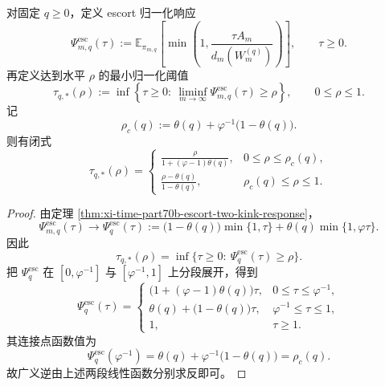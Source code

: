 \begin{theorem}\label{thm:xi-time-part70ab-escort-response-inverse-threshold-closed}
对固定 \(q\ge 0\)，定义 escort 归一化响应
\[
\Psi_{m,q}^{\mathrm{esc}}(\tau):=
\mathbb E_{\pi_{m,q}}
\left[
\min\!\left(1,\frac{\tau A_m}{d_m(W_m^{(q)})}\right)
\right],
\qquad
\tau\ge 0.
\]
再定义达到水平 \(\rho\) 的最小归一化阈值
\[
\tau_{q,\ast}(\rho):=
\inf\left\{\tau\ge 0:\ \liminf_{m\to\infty}\Psi_{m,q}^{\mathrm{esc}}(\tau)\ge \rho\right\},
\qquad
0\le \rho\le 1.
\]
记
\[
\rho_c(q):=\theta(q)+\varphi^{-1}\bigl(1-\theta(q)\bigr).
\]
则有闭式
\[
\tau_{q,\ast}(\rho)=
\begin{cases}
\displaystyle \frac{\rho}{1+(\varphi-1)\theta(q)},
& 0\le \rho\le \rho_c(q),\\[3mm]
\displaystyle \frac{\rho-\theta(q)}{1-\theta(q)},
& \rho_c(q)\le \rho\le 1.
\end{cases}
\]
\end{theorem}
\begin{proof}
由定理 \ref{thm:xi-time-part70b-escort-two-kink-response}，
\[
\Psi_{m,q}^{\mathrm{esc}}(\tau)\longrightarrow
\Psi_q^{\mathrm{esc}}(\tau):=
\bigl(1-\theta(q)\bigr)\min\{1,\tau\}
+
\theta(q)\min\{1,\varphi\tau\}.
\]
因此
\[
\tau_{q,\ast}(\rho)=\inf\{\tau\ge 0:\ \Psi_q^{\mathrm{esc}}(\tau)\ge \rho\}.
\]
把 \(\Psi_q^{\mathrm{esc}}\) 在 \([0,\varphi^{-1}]\) 与 \([\varphi^{-1},1]\) 上分段展开，得到
\[
\Psi_q^{\mathrm{esc}}(\tau)=
\begin{cases}
\bigl(1+(\varphi-1)\theta(q)\bigr)\tau,
& 0\le \tau\le \varphi^{-1},\\[6pt]
\theta(q)+\bigl(1-\theta(q)\bigr)\tau,
& \varphi^{-1}\le \tau\le 1,\\[6pt]
1, & \tau\ge 1.
\end{cases}
\]
其连接点函数值为
\[
\Psi_q^{\mathrm{esc}}(\varphi^{-1})
=
\theta(q)+\varphi^{-1}\bigl(1-\theta(q)\bigr)
=
\rho_c(q).
\]
故广义逆由上述两段线性函数分别求反即可。
\end{proof}

